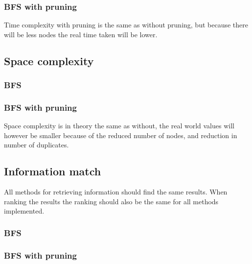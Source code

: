 \subsubsection{BFS with pruning}
Time complexity with pruning is the same as without pruning, but because there will be less nodes the real time taken will be lower.\\

\subsection{Space complexity}
\subsubsection{BFS}

\subsubsection{BFS with pruning}
Space complexity is in theory the same as without, the real world values will however be smaller because of the reduced number of nodes, and reduction in number of duplicates.\\

\subsection{Information match}
All methods for retrieving information should find the same results. When ranking the results the ranking should also be the same for all methods implemented.\\

\subsubsection{BFS}

\subsubsection{BFS with pruning}


\clearpage
